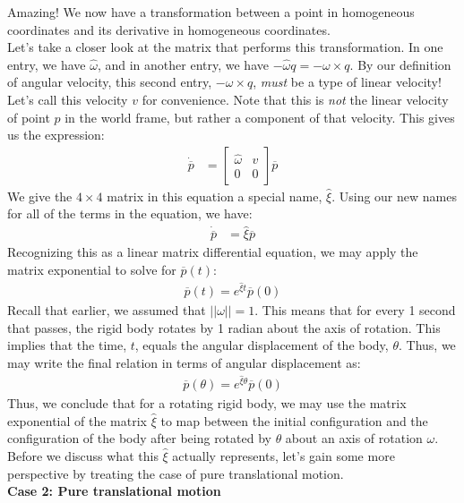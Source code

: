 \documentclass[oneside]{book}
\begin{document}
Amazing! We now have a transformation between a point in homogeneous coordinates and its derivative in homogeneous coordinates.\\
Let's take a closer look at the matrix that performs this transformation. In one entry, we have $\hat\omega$, and in another entry, we have $-\hat\omega q = -\omega \times q$. By our definition of angular velocity, this second entry, $-\omega \times q$, \textit{must} be a type of linear velocity! Let's call this velocity $v$ for convenience. Note that this is \textit{not} the linear velocity of point $p$ in the world frame, but rather a component of that velocity. This gives us the expression:
\begin{align}
    \dot{\overline{p}} &= 
    \begin{bmatrix}
    \hat\omega & v\\
    0 & 0
    \end{bmatrix}
    \overline{p}
\end{align}
We give the $4\times 4$ matrix in this equation a special name, $\hat\xi$. Using our new names for all of the terms in the equation, we have:
\begin{align}
    \dot{\overline{p}} &= \hat\xi \overline{p}
\end{align}
Recognizing this as a linear matrix differential equation, we may apply the matrix exponential to solve for $\overline{p}(t)$:
\begin{align}
    \overline{p}(t) = e^{\hat\xi t}\overline{p}(0)
\end{align}
Recall that earlier, we assumed that $||\omega|| = 1$. This means that for every 1 second that passes, the rigid body rotates by 1 radian about the axis of rotation. This implies that the time, $t$, equals the angular displacement of the body, $\theta$. Thus, we may write the final relation in terms of angular displacement as:
\begin{align}
    \overline{p}(\theta) = e^{\hat\xi \theta}\overline{p}(0)
\end{align}
Thus, we conclude that for a rotating rigid body, we may use the matrix exponential of the matrix $\hat\xi$ to map between the initial configuration and the configuration of the body after being rotated by $\theta$ about an axis of rotation $\omega$.\\
Before we discuss what this $\hat\xi$ actually represents, let's gain some more perspective by treating the case of pure translational motion.\\
\textbf{Case 2: Pure translational motion}
\end{document}
